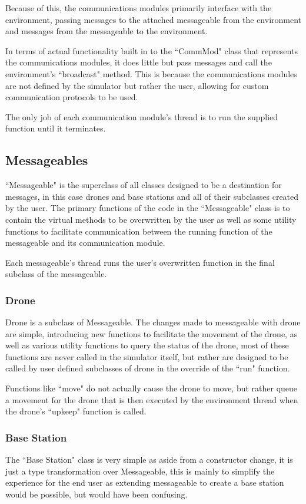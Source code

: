 		Because of this, the communications modules primarily interface with the environment, passing messages
		to the attached messageable from the environment and messages from the messageable to the environment.

		In terms of actual functionality built in to the ``CommMod" class that represents the communications
		modules, it does little but pass messages and call the environment's ``broadcast" method. This is because
		the communications modules are not defined by the simulator but rather the user, allowing for custom
		communication protocols to be used.

		The only job of each communication module's thread is to run the supplied function until it terminates.

	\subsection{Messageables}
		``Messageable" is the superclass of all classes designed to be a destination for messages, in this case
		drones and base stations and all of their subclasses created by the user. The primary functions of the
		code in the ``Messageable" class is to contain the virtual methods to be overwritten by the user as
		well as some utility functions to facilitate communication between the running function of the messageable
		and its communication module.

		Each messageable's thread runs the user's overwritten function in the final subclass of the messageable.

		\subsubsection{Drone}
			Drone is a subclass of Messageable. The changes made to messageable with drone are simple, introducing
			new functions to facilitate the movement of the drone, as well as various utility functions to query the
			status of the drone, most of these functions are never called in the simulator itself, but rather are
			designed to be called by user defined subclasses of drone in the override of the ``run" function.

			Functions like ``move" do not actually cause the drone to move, but rather queue a movement for the drone
			that is then executed by the environment thread when the drone's ``upkeep" function is called.

		\subsubsection{Base Station}
			The ``Base Station" class is very simple as aside from a constructor change, it is just a type transformation
			over Messageable, this is mainly to simplify the experience for the end user as extending messageable to create
			a base station would be possible, but would have been confusing.

